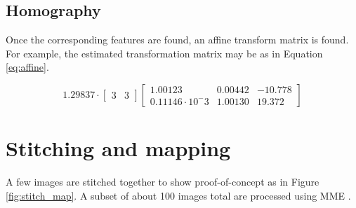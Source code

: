 \subsection{Homography}

Once the corresponding features are found, an affine transform matrix is found. For example, the estimated transformation matrix may be as in Equation \ref{eq:affine}.

\begin{equation}\label{eq:affine}
1.29837\cdot\begin{bmatrix}3 &3\end{bmatrix}
\begin{bmatrix}
1.00123 & 0.00442 & -10.778 \\ 0.11146\cdot10^-3 & 1.00130 & 19.372
\end{bmatrix}
\end{equation}

\section{Stitching and mapping}

A few images are stitched together to show proof-of-concept as in Figure \ref{fig:stitch_map}. A subset of about 100 images total are processed using MME \cite{mme}.

